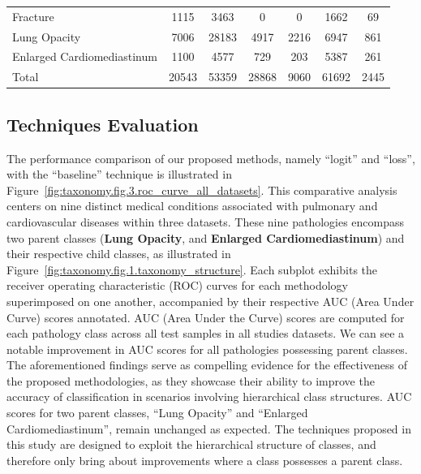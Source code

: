\documentclass[review,1p,times,numbers]{elsarticle}
\begin{document}
\begin{table}[htbp]
\begin{tabular}{lcccccc}
        Fracture           & 1115 & 3463  & 0    & 0    & 1662 & 69  \\
        Lung Opacity& 7006 & 28183 &
        \cellcolor{table_row_highlight}4917 &
        \cellcolor{table_row_highlight}2216 &
        \cellcolor{table_row_highlight}6947 &
        \cellcolor{table_row_highlight}861 \\
        Enlarged Cardiomediastinum & 1100 & 4577 &
        \cellcolor{table_row_highlight}729 &
        \cellcolor{table_row_highlight}203 &
        \cellcolor{table_row_highlight}5387 &
        \cellcolor{table_row_highlight}261 \\
        \rowcolor[HTML]{79A8A4}
        Total & 20543 & 53359 & 28868 & 9060 & 61692 & 2445
    \end{tabular}
\end{table}
%

\subsection{Techniques Evaluation}
The performance comparison of our proposed methods, namely ``logit'' and ``loss'', with the ``baseline'' technique is illustrated in Figure~\ref{fig:taxonomy.fig.3.roc_curve_all_datasets}. This comparative analysis centers on nine distinct medical conditions associated with pulmonary and cardiovascular diseases within three datasets. These nine pathologies encompass two parent classes (\textbf{Lung Opacity}, and \textbf{Enlarged Cardiomediastinum}) and their respective child classes, as illustrated in Figure~\ref{fig:taxonomy.fig.1.taxonomy_structure}. Each subplot exhibits the receiver operating characteristic (ROC) curves for each methodology superimposed on one another, accompanied by their respective AUC (Area Under Curve) scores annotated. AUC (Area Under the Curve) scores are computed for each pathology class across all test samples in all studies datasets. We can see a notable improvement in AUC scores for all pathologies possessing parent classes. The aforementioned findings serve as compelling evidence for the effectiveness of the proposed methodologies, as they showcase their ability to improve the accuracy of classification in scenarios involving hierarchical class structures. AUC scores for two parent classes, ``Lung Opacity'' and ``Enlarged Cardiomediastinum'', remain unchanged as expected. The techniques proposed in this study are designed to exploit the hierarchical structure of classes, and therefore only bring about improvements where a class possesses a parent class.
\end{document}
